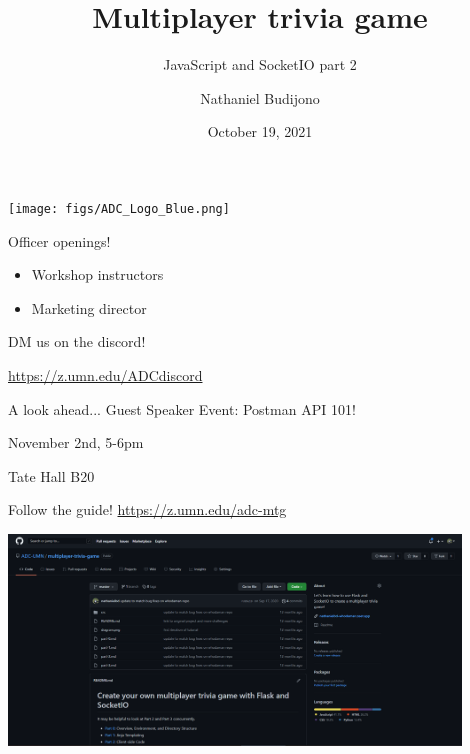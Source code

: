 \documentclass{beamer}
\title{Multiplayer trivia game}
\subtitle{JavaScript and SocketIO part 2}
\author{Nathaniel Budijono}
\date{October 19, 2021}
\institute{UMN ADC}
\begin{document}
\begin{frame}
    \titlepage
    \texttt{[image: figs/ADC\_Logo\_Blue.png]}
\end{frame}

\begin{frame}{Officer openings!}
	\begin{itemize}
		\item Workshop instructors
		\item Marketing director
	\end{itemize}

	\bigskip

	DM us on the discord!

	\bigskip

	\href{https://z.umn.edu/ADCdiscord}{https://z.umn.edu/ADCdiscord}
\end{frame}

\begin{frame}{A look ahead...}
	\centering
	{\Huge Guest Speaker Event: Postman API 101!}

	\bigskip

	November 2nd, 5-6pm

	\bigskip

	Tate Hall B20
\end{frame}

\begin{frame}{Follow the guide!}
	\centering
	\href{https://z.umn.edu/adc-mtg}{https://z.umn.edu/adc-mtg}

	\bigskip

	\includegraphics[width=0.9\textwidth]{figs/guide.png}
\end{frame}
\end{document}
